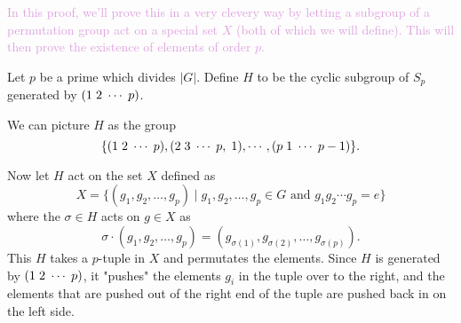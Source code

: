 \documentclass[12pt,letterpaper]{algebra_book}
\theoremstyle{definition}
\begin{document}
    \begin{prf}
        \textcolor{Plum}{In this proof, we'll prove this in a very
        clevery way by letting a subgroup of a permutation group act
        on a special set $X$ (both of which we will define). This will then prove the existence of
        elements of order $p$.}

        Let $p$ be a prime which divides $|G|$. 
        Define $H$ to be the cyclic subgroup of $S_p$ generated by
        $(1\hspace{.1cm}2\hspace{.1cm}\cdots\hspace{.1cm}p)$. 

        We can picture $H$ as the group 
        \[
            \{(1\hspace{.1cm}2\hspace{.1cm}\cdots\hspace{.1cm}p), (2\hspace{.1cm}3\hspace{.1cm}\cdots\hspace{.1cm}p, \hspace{.1cm}1), \cdots, (p\hspace{.1cm}1\hspace{.1cm}\cdots\hspace{.1cm}p-1)\}.
        \]

        Now let $H$ act on the set $X$ defined as 
        \[
            X = \{ (g_1, g_2, \dots, g_p) \mid g_1, g_2, \dots, g_p \in G \text{ and } g_1g_2\cdots g_p = e \}
        \]
        where the $\sigma \in H$ acts on $g \in X$ as 
        \[
            \sigma \cdot (g_1, g_2, \dots, g_p) = (g_{\sigma(1)}, g_{\sigma(2)}, \dots, g_{\sigma(p)}).
        \]
        This $H$ takes a $p$-tuple in $X$ and permutates the elements.
        Since $H$ is generated by
        $(1\hspace{.1cm}2\hspace{.1cm}\cdots\hspace{.1cm}p)$, it
        "pushes" the elements $g_i$ in the tuple over to the right, and the elements
        that are pushed out of the right end of the tuple are pushed back in on
        the left side.


\end{prf}
\end{document}
